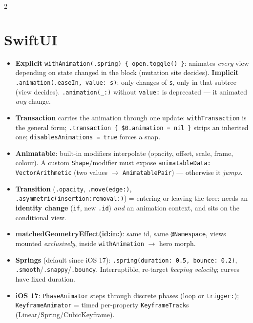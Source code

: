 \documentclass[8pt]{extarticle}
\begin{document}


\begin{multicols}{2}
\raggedright

\section{SwiftUI}
\begin{itemize}
  \item \textbf{Explicit} \texttt{withAnimation(.spring) \{ open.toggle() \}}:
        animates \emph{every} view depending on state changed in the block
        (mutation site decides). \textbf{Implicit}
        \texttt{.animation(.easeIn, value: s)}: only changes of \texttt{s}, only
        in that subtree (view decides). \texttt{.animation(\_:)} without
        \texttt{value:} is deprecated — it animated \emph{any} change.
  \item \textbf{Transaction} carries the animation through one update:
        \texttt{withTransaction} is the general form;
        \texttt{.transaction \{ \$0.animation = nil \}} strips an inherited one;
        \texttt{disablesAnimations = true} forces a snap.
  \item \textbf{Animatable}: built-in modifiers interpolate (opacity, offset,
        scale, frame, colour). A custom \texttt{Shape}/modifier must expose
        \texttt{animatableData: VectorArithmetic} (two values $\to$
        \texttt{AnimatablePair}) — otherwise it \emph{jumps}.
  \item \textbf{Transition} (\texttt{.opacity}, \texttt{.move(edge:)}, \\
        \texttt{.asymmetric(insertion:removal:)}) = entering or leaving the tree:
        needs an \textbf{identity change} (\texttt{if}, new \texttt{.id}) \emph{and}
        an animation context, and sits on the conditional view.
  \item \textbf{matchedGeometryEffect(id:in:)}: same id, same
        \texttt{@Namespace}, views mounted \emph{exclusively}, inside
        \texttt{withAnimation} $\to$ hero morph.
  \item \textbf{Springs} (default since iOS 17): \texttt{.spring(duration: 0.5,
        bounce: 0.2)}, \texttt{.smooth}/\texttt{.snappy}/\texttt{.bouncy}.
        Interruptible, re-target \emph{keeping velocity}; curves have fixed duration.
  \item \textbf{iOS 17}: \texttt{PhaseAnimator} steps through discrete phases
        (loop or \texttt{trigger:}); \texttt{KeyframeAnimator} = timed
        per-property \texttt{KeyframeTrack}s (Linear/Spring/Cubic\-Keyframe).
\end{itemize}


\end{multicols}
\end{document}

